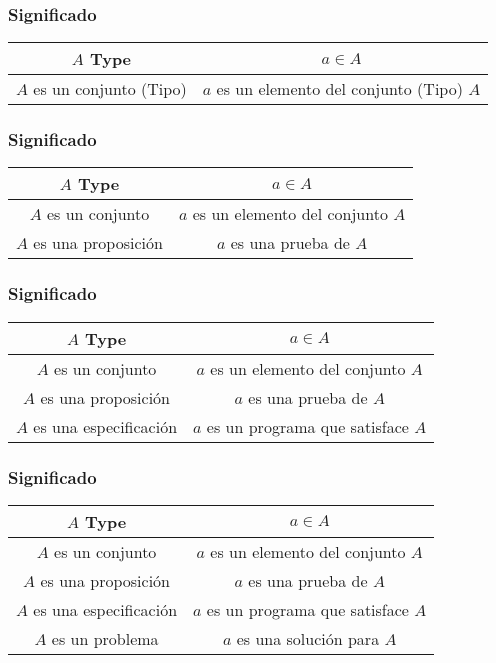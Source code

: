 \documentclass{beamer}
\begin{document}
\begin{frame}
  \frametitle{Significado}
  \begin{tabular}{|c|c|}
    \hline
    \textbf{$A$ Type} & \textbf{$a \in A$} \\
    \hline
    $A$ es un conjunto (Tipo) & $a$ es un elemento del conjunto (Tipo) $A$\\
    \hline
  \end{tabular}
\end{frame}
\begin{frame}
  \frametitle{Significado}
  \begin{tabular}{|c|c|}
    \hline
    \textbf{$A$ Type} & \textbf{$a \in A$} \\
    \hline
    $A$ es un conjunto & $a$ es un elemento del conjunto $A$\\
    \hline
    $A$ es una proposici\'on & $a$ es una prueba de $A$ \\
    \hline
  \end{tabular}
\end{frame}
\begin{frame}
  \frametitle{Significado}
  \begin{tabular}{|c|c|}
    \hline
    \textbf{$A$ Type} & \textbf{$a \in A$} \\
    \hline
    $A$ es un conjunto & $a$ es un elemento del conjunto $A$\\
    \hline
    $A$ es una proposici\'on & $a$ es una prueba de $A$ \\
    \hline
    $A$ es una especificaci\'on & $a$ es un programa que satisface $A$ \\
    \hline
  \end{tabular}
\end{frame}
\begin{frame}
  \frametitle{Significado}
  \begin{tabular}{|c|c|}
    \hline
    \textbf{$A$ Type} & \textbf{$a \in A$} \\
    \hline
    $A$ es un conjunto & $a$ es un elemento del conjunto $A$\\
    \hline
    $A$ es una proposici\'on & $a$ es una prueba de $A$ \\
    \hline
    $A$ es una especificaci\'on & $a$ es un programa que satisface $A$ \\
    \hline
    $A$ es un problema & $a$ es una soluci\'on para $A$ \\
    \hline

  \end{tabular}
\end{frame}
\end{document}
